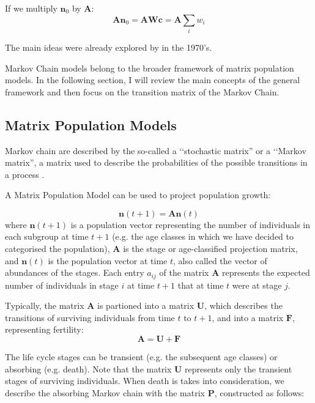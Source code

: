 \documentclass[\main/main.tex]{subfiles}
\begin{document}
If we multiply $\mathbf{n}_0$ by $\mathbf{A}$:
\begin{equation}
    \mathbf{A} \mathbf{n}_0 = \mathbf{A} \mathbf{Wc} = \mathbf{A}  \sum_{i} w_i
\end{equation}





The main ideas were already explored by \cite{Feichtinger1973} in the 1970's.




Markov Chain models belong to the broader framework of matrix population models. In the following section, I will review the main concepts of the general framework and then focus on the transition matrix of the Markov Chain.

\subsection{Matrix Population Models}

Markov chain are described by the so-called a \lq\lq stochastic matrix'' or a \lq\lq Markov matrix'', a matrix used to describe the probabilities of the possible transitions in a process .

A Matrix Population Model can be used to project population growth:

\begin{equation}\label{eq:1}
    \mathbf{n} (t+1) = \mathbf{An}(t)
\end{equation}
where $\mathbf{n} (t+1)$ is a population vector representing the number of individuals in each subgroup at time $t +1$ (e.g. the age classes in which we have decided to categorised the population), $\mathbf{A}$ is the stage or age-classified projection matrix, and $\mathbf{n} (t)$ is the population vector at time $t$, also called the vector of abundances of the stages.
Each entry $a_{ij}$ of the matrix $\mathbf{A}$ represents the expected number of individuals in stage $i$ at time $t + 1$ that at time $t$ were at stage $j$. 

Typically, the matrix $\mathbf{A}$ is partioned into a matrix $\mathbf{U}$, which describes the transitions of surviving individuals from time $t$ to $t+1$, and into a matrix $\mathbf{F}$, representing fertility:
\begin{equation}
    \mathbf{A} =  \mathbf{U} + \mathbf{F}
\end{equation}

The life cycle stages can be transient (e.g. the subsequent age classes) or absorbing (e.g. death). Note that the matrix $\mathbf{U}$ represents only the transient stages of surviving individuals.
When death is takes into consideration, we describe the absorbing Markov chain with the matrix $\mathbf{P}$, constructed as follows:
\end{document}
